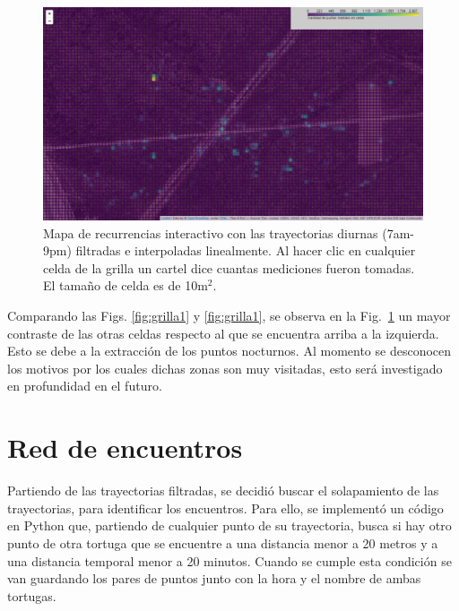 \begin{figure}[ht]
    \begin{center}
       
   
    \includegraphics[width=\imsize]{Chap2/GrillaCintSNoche.png}
\end{center}
    \caption[Mapa con zona de recurrencia para trayectorias diurnas.]{Mapa de recurrencias  interactivo con las trayectorias diurnas (7am-9pm) filtradas e interpoladas linealmente. Al hacer clic en cualquier celda de la grilla un cartel dice cuantas mediciones fueron tomadas. El tamaño de celda es de 10m$^2$.}
    \label{fig:grillaInt}
\end{figure}


Comparando las Figs. \ref{fig:grilla1} y \ref{fig:grilla1}, se observa en la  Fig.~\ref{fig:grillaInt} un mayor contraste de las otras celdas respecto al que se encuentra arriba a la izquierda. Esto se debe a la extracción de los puntos nocturnos. Al momento se desconocen los motivos por los cuales dichas zonas son muy visitadas, esto será investigado en profundidad en el futuro.
 
\section{Red de encuentros}
Partiendo de las trayectorias filtradas, se decidió buscar el solapamiento de las trayectorias, para identificar los encuentros. Para ello, se implementó un código en Python que, partiendo de cualquier punto de su trayectoria, busca si hay otro punto de otra tortuga que se encuentre a una distancia menor a 20 metros y a una distancia temporal menor a 20 minutos. Cuando se cumple esta condición se van guardando los pares de puntos junto con la hora y el nombre de ambas tortugas.
 
